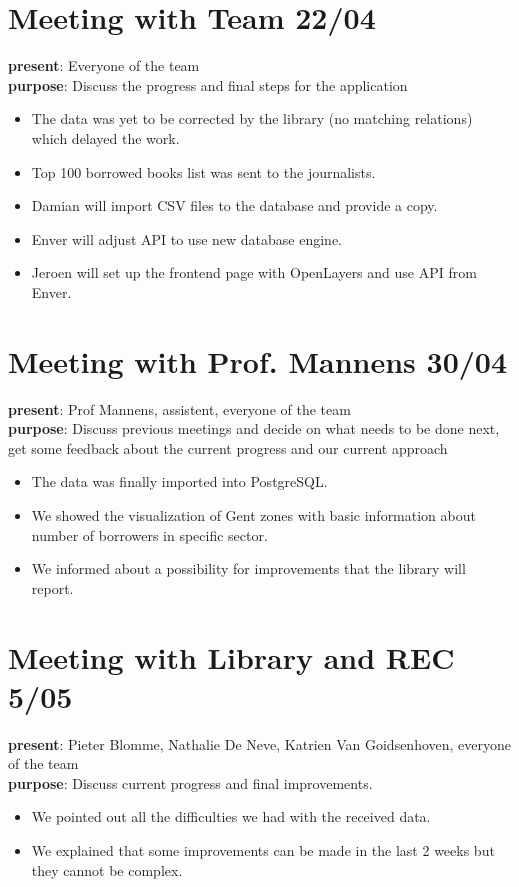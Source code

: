 \section{Meeting with Team 22/04}
{\bf present}: Everyone of the team\\
{\bf purpose}: Discuss the progress and final steps for the application\\
\begin{itemize}
	\item The data was yet to be corrected by the library (no matching relations) which delayed the work.
	\item Top 100 borrowed books list was sent to the journalists.
	\item Damian will import CSV files to the database and provide a copy.
	\item Enver will adjust API to use new database engine.
	\item Jeroen will set up the frontend page with OpenLayers and use API from Enver.
\end{itemize}

\section{Meeting with Prof. Mannens 30/04}
{\bf present}: Prof Mannens, assistent, everyone of the team\\
{\bf purpose}: Discuss previous meetings and decide on what needs to be done next, get some feedback about the current progress and our current approach\\
\begin{itemize}
	\item The data was finally imported into PostgreSQL.
	\item We showed the visualization of Gent zones with basic information about number of borrowers in specific sector.
	\item We informed about a possibility for improvements that the library will report.
\end{itemize}

\section{Meeting with Library and REC 5/05}
{\bf present}: Pieter Blomme, Nathalie De Neve, Katrien Van Goidsenhoven, everyone of the team\\
{\bf purpose}: Discuss current progress and final improvements.\\
\begin{itemize}
	\item We pointed out all the difficulties we had with the received data.
	\item We explained that some improvements can be made in the last 2 weeks but they cannot be complex.
\end{itemize}